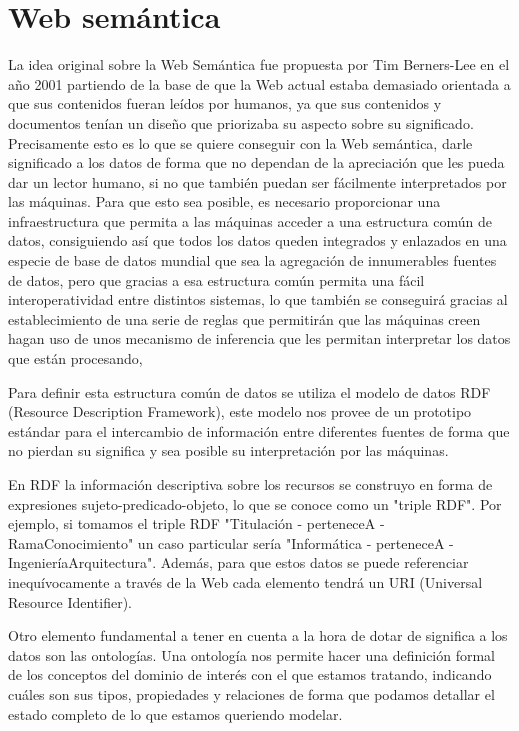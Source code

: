 \section{Web semántica}
La idea original sobre la Web Semántica fue propuesta por Tim Berners-Lee en el año 2001 partiendo de la base de que la Web actual estaba demasiado orientada a que sus contenidos fueran leídos por humanos, ya que sus contenidos y documentos tenían un diseño que priorizaba su aspecto sobre su significado. Precisamente esto es lo que se quiere conseguir con la Web semántica, darle significado a los datos de forma que no dependan de la apreciación que les pueda dar un lector humano, si no que también puedan ser fácilmente interpretados por las máquinas. Para que esto sea posible, es necesario proporcionar una infraestructura que permita a las máquinas acceder a una estructura común de datos, consiguiendo así que todos los datos queden integrados y enlazados en una especie de base de datos mundial que sea la agregación de innumerables fuentes de datos, pero que gracias a esa estructura común permita una fácil interoperatividad entre distintos sistemas, lo que también se conseguirá gracias al establecimiento de una serie de reglas que permitirán que las máquinas creen hagan uso de unos mecanismo de inferencia que les permitan interpretar los datos que están procesando, 

\bigskip
Para definir esta estructura común de datos se utiliza el modelo de datos RDF (Resource Description Framework), este modelo nos provee de un prototipo estándar para el intercambio de información entre diferentes fuentes de forma que no pierdan su significa y sea posible su interpretación por las máquinas. 

\bigskip En RDF la información descriptiva sobre los recursos se construyo en forma de expresiones sujeto-predicado-objeto, lo que se conoce como un "triple RDF". Por ejemplo, si tomamos el triple RDF "Titulación - perteneceA - RamaConocimiento" un caso particular sería "Informática - perteneceA - IngenieríaArquitectura". Además, para que estos datos se puede referenciar inequívocamente a través de la Web cada elemento tendrá un URI (Universal Resource Identifier).

\bigskip

Otro elemento fundamental a tener en cuenta a la hora de dotar de significa a los datos son las ontologías. Una ontología nos permite hacer una definición formal de los conceptos del dominio de interés con el que estamos tratando, indicando cuáles son sus tipos, propiedades y relaciones de forma que podamos detallar el estado completo de lo que estamos queriendo modelar.

